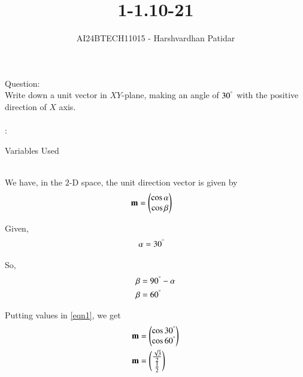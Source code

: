 \documentclass[journal]{IEEEtran}
\begin{document}

\vspace{3cm}

\title{1-1.10-21}
\author{AI24BTECH11015 - Harshvardhan Patidar}
 \maketitle
{\let\newpage\relax\maketitle}

\renewcommand{\thefigure}{\theenumi}
\renewcommand{\thetable}{\theenumi}
\setlength{\intextsep}{10pt} %


\renewcommand{\thetable}{\theenumi}

Question: \\
	Write down a unit vector in $XY$-plane, making an angle of $30^{\degree}$ with the positive direction of $X$ axis. \\ \\

\solution: \\
		\begin{table}[h!]    
  			\centering
  			
  			\caption{Variables Used}
  			\label{tab1-1.10-21}
		\end{table}\\


	We have, in the $2$-D space, the unit direction vector is given by
	\begin{align}
		\mathbf{m} &= \begin{pmatrix}\cos \alpha \\ \cos \beta\end{pmatrix}\label{eqn1} 
	\end{align}

	Given, 
	\begin{align}
		\alpha &= 30^{\degree} 
	\end{align}

	So,
	\begin{align}
		\beta &= 90^{\degree} - \alpha\\
		\beta &= 60^{\degree}
	\end{align}

	Putting values in \eqref{eqn1}, we get
	\begin{align}
		\mathbf{m} &= \begin{pmatrix}\cos 30^{\degree} \\ \cos 60^{\degree}\end{pmatrix}\\
		\mathbf{m} &= \begin{pmatrix}\frac{\sqrt{3}}{2} \\ \frac{1}{2}\end{pmatrix}	
	\end{align}
\end{document}
